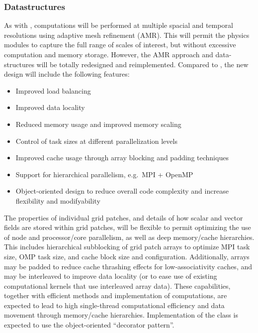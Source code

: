 \documentclass[11pt]{article}
\begin{document}

    \subsubsection{Datastructures}

    
    As with \enzo, computations will be performed at multiple spacial
    and temporal resolutions using adaptive mesh refinement (AMR).
    This will permit the physics modules to capture the full range of
    scales of interest, but without excessive computation and memory
    storage.  However, the AMR approach and data-structures will be
    totally redesigned and reimplemented.  Compared to \enzo, the new
    design will include the following features:

    \begin{itemize}
    \item Improved load balancing
    \item Improved data locality
    \item Reduced memory usage and improved memory scaling
    \item Control of task sizes at different parallelization levels
    \item Improved cache usage through array blocking and padding techniques
    \item Support for hierarchical parallelism, e.g.~MPI + OpenMP
    \item Object-oriented design to reduce overall code complexity and 
          increase flexibility and modifyability
    \end{itemize}



    The properties of individual grid patches, and details of how
    scalar and vector fields are stored within grid patches, will be
    flexible to permit optimizing the use of node and processor/core
    parallelism, as well as deep memory/cache hierarchies.  This
    includes hierarchical subblocking of grid patch arrays to optimize
    MPI task size, OMP task size, and cache block size and
    configuration.  Additionally, arrays may be padded to reduce cache
    thrashing effects for low-associativity caches, and may be
    interleaved to improve data locality (or to ease use of existing
    computational kernels that use interleaved array data).  These
    capabilities, together with efficient methods and implementation
    of computations, are expected to lead to high single-thread
    computational efficiency and data movement through memory/cache
    hierarchies.  Implementation of the  class is expected
    to use the object-oriented ``decorator pattern''.
\end{document}
